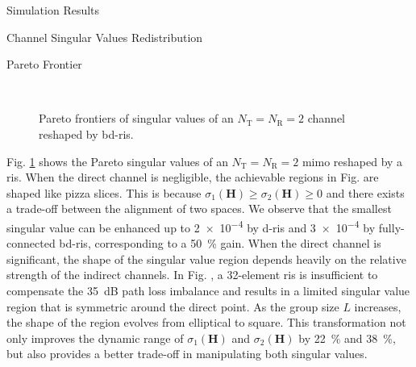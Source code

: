 \begin{section}{Simulation Results}
 \begin{subsection}{Channel Singular Values Redistribution}
	 \begin{subsubsection}{Pareto Frontier}
		 \begin{figure}[!t]
			 \centering
			 \\
			 \caption{Pareto frontiers of singular values of an $N_\mathrm{T}=N_\mathrm{R}=2$ channel reshaped by \gls{bd}-\gls{ris}.}
			 \label{fg:singular_pareto}
		 \end{figure}
		 Fig. \ref{fg:singular_pareto} shows the Pareto singular values of an $N_\mathrm{T}=N_\mathrm{R}=2$ \gls{mimo} reshaped by a \gls{ris}.
		 When the direct channel is negligible, the achievable regions in Fig.  are shaped like pizza slices.
		 This is because $\sigma_1(\mathbf{H}) \ge \sigma_2(\mathbf{H}) \ge 0$ and there exists a trade-off between the alignment of two spaces.
		 We observe that the smallest singular value can be enhanced up to \num{2e-4} by \gls{d}-\gls{ris} and \num{3e-4} by fully-connected \gls{bd}-\gls{ris}, corresponding to a \qty{50}{\percent} gain.
		 When the direct channel is significant, the shape of the singular value region depends heavily on the relative strength of the indirect channels.
		 In Fig. , a 32-element \gls{ris} is insufficient to compensate the \qty{35}{dB} path loss imbalance and results in a limited singular value region that is symmetric around the direct point.
		 As the group size $L$ increases, the shape of the region evolves from elliptical to square.
		 This transformation not only improves the dynamic range of $\sigma_1(\mathbf{H})$ and $\sigma_2(\mathbf{H})$ by \qty{22}{\percent} and \qty{38}{\percent}, but also provides a better trade-off in manipulating both singular values.

\end{subsubsection}
\end{subsection}
\end{section}
